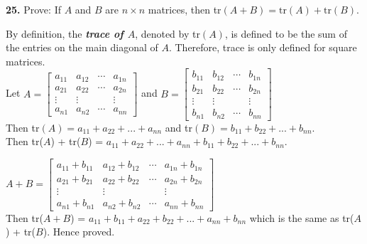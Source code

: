 \documentclass[addpoints]{exam}
\begin{document}
\begin{sloppypar}
\begin{questions}
    \question
    \textbf{25. } Prove: If $A$ and $B$ are $ n \times n $ matrices, then tr$ (A + B)  = \text{tr}(A) + \text{tr}(B)$.
    \begin{solution}
        By definition, the \textbf{\textit{trace of $A$}}, denoted by tr$(A)$, is defined to be the sum of the entries on the main diagonal of $A$. Therefore, trace is only defined for square matrices. \\ 
        Let $ A = \begin{bmatrix}
            a_{11} & a_{12} & \cdots & a_{1n} \\ 
            a_{21} & a_{22} & \cdots & a_{2n} \\ 
            \vdots & \vdots & & \vdots \\ 
            a_{n1} & a_{n2} & \cdots & a_{nn}
        \end{bmatrix} $ and $ B = \begin{bmatrix}
            b_{11} & b_{12} & \cdots & b_{1n} \\ 
            b_{21} & b_{22} & \cdots & b_{2n} \\ 
            \vdots & \vdots & & \vdots \\ 
            b_{n1} & b_{n2} & \cdots & b_{nn}
        \end{bmatrix} $ \\ 
        Then tr$(A) = a_{11} + a_{22} + ... + a_{nn}$ and tr$(B) = b_{11} + b_{22} + ... + b_{nn}$. \\ 
        Then tr($A$) + tr($B$) = $ a_{11} + a_{22} + ... + a_{nn} + b_{11} + b_{22} + ... + b_{nn} $. 

        \vspace{3mm}
        $ A + B = \begin{bmatrix}
            a_{11} + b_{11} & a_{12} + b_{12} & \cdots & a_{1n} + b_{1n} \\ 
            a_{21} + b_{21} & a_{22} + b_{22} & \cdots & a_{2n} + b_{2n} \\ 
            \vdots & \vdots & & \vdots \\ 
            a_{n1} + b_{n1} & a_{n2} + b_{n2} & \cdots & a_{nn} + b_{nn} 
        \end{bmatrix} $ \\ 
        Then tr($A+B$) = $ a_{11} + b_{11} + a_{22} + b_{22} + ... + a_{nn} + b_{nn} $ which is the same as tr($A$) + tr($B$). Hence proved.

    \end{solution}

\end{questions}
\end{sloppypar}
\end{document}
